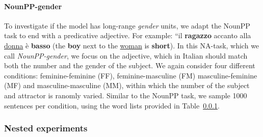 \paragraph{NounPP-gender}
To investigate if the model has long-range \emph{gender} units, we adapt the NounPP task to end with a predicative adjective.
For example: ``il \textbf{ragazzo} accanto alla \underline{donna} \`{e} \textbf{basso} (the \textbf{boy} next to the \underline{woman} is \textbf{short}).
In this NA-task, which we call \emph{NounPP-gender}, we focus on the adjective, which in Italian should match both the number and the gender of the subject.
We again consider four different conditions: feminine-feminine (FF), feminine-masculine (FM) masculine-feminine (MF) and masculine-masculine (MM), within which the number of the subject and attractor is ranomly varied.
Similar to the NounPP task, we sample 1000 sentences per condition, using the word lists provided in Table~\ref{}.

\subsubsection{Nested experiments}



